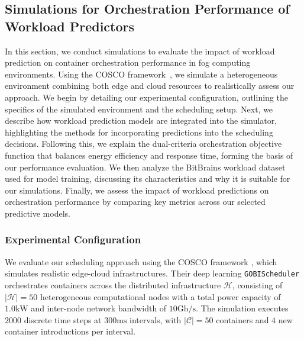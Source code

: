 \documentclass{ieeetmlcn}
\begin{document}

\subsection{Simulations for Orchestration Performance of Workload Predictors}
\label{sec:simulations}


{\color{blue}
In this section, we conduct simulations to evaluate the impact of workload prediction on container orchestration performance in fog computing environments. Using the COSCO framework~\cite{tuli2021cosco}, we simulate a heterogeneous environment combining both edge and cloud resources to realistically assess our approach. We begin by detailing our experimental configuration, outlining the specifics of the simulated environment and the scheduling setup. Next, we describe how workload prediction models are integrated into the simulator, highlighting the methods for incorporating predictions into the scheduling decisions. Following this, we explain the dual-criteria orchestration objective function that balances energy efficiency and response time, forming the basis of our performance evaluation. We then analyze the BitBrains workload dataset used for model training, discussing its characteristics and why it is suitable for our simulations. Finally, we assess the impact of workload predictions on orchestration performance by comparing key metrics across our selected predictive models.
}


\subsubsection{Experimental Configuration}

We evaluate our scheduling approach using the COSCO framework \cite{tuli2021cosco}, which simulates realistic edge-cloud infrastructures. Their deep learning \texttt{GOBIScheduler} orchestrates containers across the distributed infrastructure $\mathcal{H}$, consisting of $|\mathcal{H}| = 50$ heterogeneous computational nodes with a total power capacity of $1.0 \text{kW}$ and inter-node network bandwidth of $10 \text{Gb}/\text{s}$. The simulation executes $2000$ discrete time steps at $300 \text{ms}$ intervals, with $|\mathcal{C}| = 50$ containers and $4$ new container introductions per interval.
\end{document}
